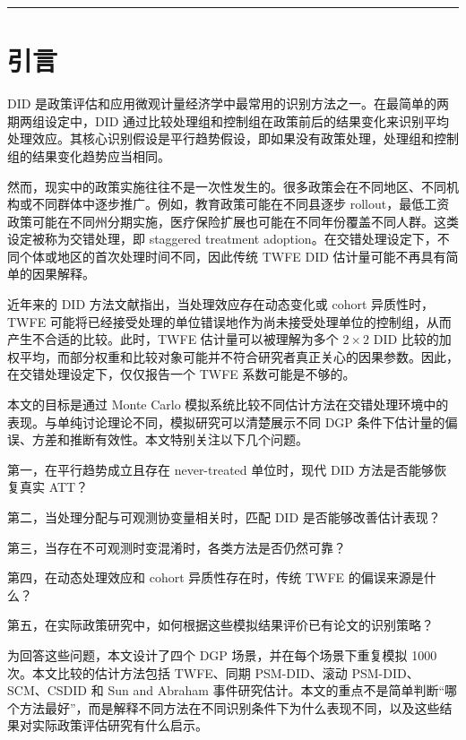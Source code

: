 \documentclass[
  fontset=windows]{ctexart}
\begin{document}
\begin{center}\rule{0.5\linewidth}{0.5pt}\end{center}

\section{引言}\label{ux5f15ux8a00}

DID
是政策评估和应用微观计量经济学中最常用的识别方法之一。在最简单的两期两组设定中，DID
通过比较处理组和控制组在政策前后的结果变化来识别平均处理效应。其核心识别假设是平行趋势假设，即如果没有政策处理，处理组和控制组的结果变化趋势应当相同。

然而，现实中的政策实施往往不是一次性发生的。很多政策会在不同地区、不同机构或不同群体中逐步推广。例如，教育政策可能在不同县逐步
rollout，最低工资政策可能在不同州分期实施，医疗保险扩展也可能在不同年份覆盖不同人群。这类设定被称为交错处理，即
staggered treatment
adoption。在交错处理设定下，不同个体或地区的首次处理时间不同，因此传统
TWFE DID 估计量可能不再具有简单的因果解释。

近年来的 DID 方法文献指出，当处理效应存在动态变化或 cohort
异质性时，TWFE
可能将已经接受处理的单位错误地作为尚未接受处理单位的控制组，从而产生不合适的比较。此时，TWFE
估计量可以被理解为多个 \(2\times 2\) DID
比较的加权平均，而部分权重和比较对象可能并不符合研究者真正关心的因果参数。因此，在交错处理设定下，仅仅报告一个
TWFE 系数可能是不够的。

本文的目标是通过 Monte Carlo
模拟系统比较不同估计方法在交错处理环境中的表现。与单纯讨论理论不同，模拟研究可以清楚展示不同
DGP 条件下估计量的偏误、方差和推断有效性。本文特别关注以下几个问题。

第一，在平行趋势成立且存在 never-treated 单位时，现代 DID
方法是否能够恢复真实 ATT？

第二，当处理分配与可观测协变量相关时，匹配 DID 是否能够改善估计表现？

第三，当存在不可观测时变混淆时，各类方法是否仍然可靠？

第四，在动态处理效应和 cohort 异质性存在时，传统 TWFE 的偏误来源是什么？

第五，在实际政策研究中，如何根据这些模拟结果评价已有论文的识别策略？

为回答这些问题，本文设计了四个 DGP 场景，并在每个场景下重复模拟 1000
次。本文比较的估计方法包括 TWFE、同期 PSM-DID、滚动 PSM-DID、SCM、CSDID
和 Sun and Abraham
事件研究估计。本文的重点不是简单判断``哪个方法最好''，而是解释不同方法在不同识别条件下为什么表现不同，以及这些结果对实际政策评估研究有什么启示。
\end{document}
